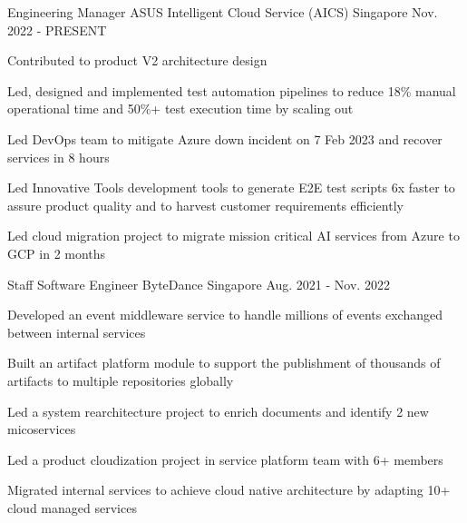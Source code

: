 

\begin{cventries}

  \cventry
    {Engineering Manager} %
    {ASUS Intelligent Cloud Service (AICS)} %
    {Singapore} %
    {Nov. 2022 - PRESENT} %
    {
      \begin{cvitems} %
        \item {Contributed to product V2 architecture design}
        \item {Led, designed and implemented test automation pipelines to reduce 18\% manual operational time and 50\%+ test execution time by scaling out}
        \item {Led DevOps team to mitigate Azure down incident on 7 Feb 2023 and recover services in 8 hours}
        \item {Led Innovative Tools development tools to generate E2E test scripts 6x faster to assure product quality and to harvest customer requirements efficiently}
				\item {Led cloud migration project to migrate mission critical AI services from Azure to GCP in 2 months}
      \end{cvitems}
    }

  \cventry
    {Staff Software Engineer} %
    {ByteDance} %
    {Singapore} %
    {Aug. 2021 - Nov. 2022} %
    {
      \begin{cvitems} %
        \item {Developed an event middleware service to handle millions of events exchanged between internal services}
        \item {Built an artifact platform module to support the publishment of thousands of artifacts to multiple repositories globally}
        \item {Led a system rearchitecture project to enrich documents and identify 2 new micoservices}
        \item {Led a product cloudization project in service platform team with 6+ members}
				\item {Migrated internal services to achieve cloud native architecture by adapting 10+ cloud managed services}
      \end{cvitems}
    }


\end{cventries}

